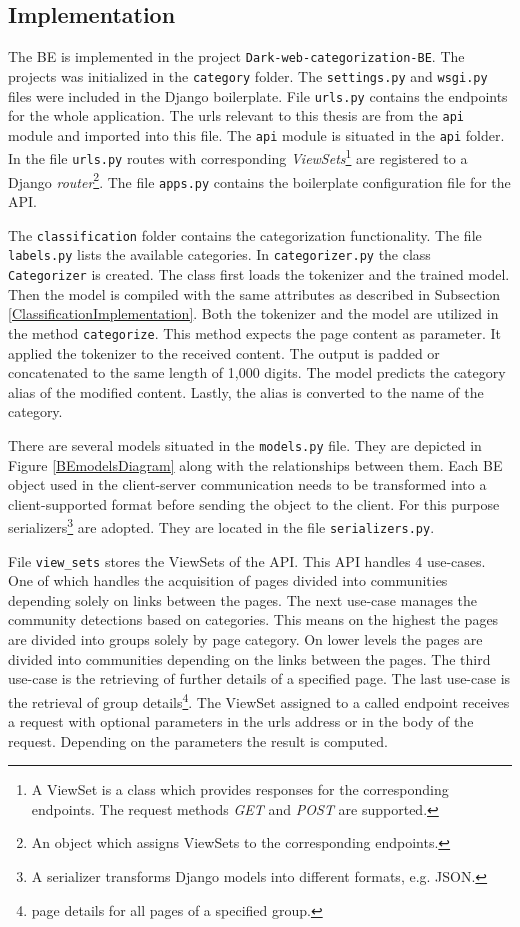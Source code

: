 \subsection{Implementation} \label{APIImplementation}
The BE is implemented in the project \texttt{Dark-web-categorization-BE}. The projects was initialized in the \texttt{category} folder. The \texttt{settings.py} and \texttt{wsgi.py} files were included in the Django boilerplate. File \texttt{urls.py} contains the endpoints for the whole application. The urls relevant to this thesis are from the \texttt{api} module and imported into this file.
The \texttt{api} module is situated in the \texttt{api} folder. In the file \texttt{urls.py} routes with corresponding \textit{ViewSets}\footnote{A ViewSet is a class which provides responses for the corresponding endpoints. The request methods \textit{GET} and \textit{POST} are supported.} are registered to a Django \textit{router}\footnote{An object which assigns ViewSets to the corresponding endpoints.}. The file \texttt{apps.py} contains the boilerplate configuration file for the API. 

The \texttt{classification} folder contains the categorization functionality. The file \texttt{labels.py} lists the available categories. In \texttt{categorizer.py} the class \texttt{Categorizer} is created. The class first loads the tokenizer and the trained model. Then the model is compiled with the same attributes as described in Subsection \ref{ClassificationImplementation}. Both the tokenizer and the model are utilized in the method \texttt{categorize}. This method expects the page content as parameter. It applied the tokenizer to the received content. The output is padded or concatenated to the same length of 1,000 digits. The model predicts the category alias of the modified content. Lastly, the alias is converted to the name of the category.

There are several models situated in the \texttt{models.py} file. They are depicted in Figure \ref{BEmodelsDiagram} along with the relationships between them. Each BE object used in the client-server communication needs to be transformed into a client-supported format before sending the object to the client. For this purpose serializers\footnote{A serializer transforms Django models into different formats, e.g. JSON.} are adopted. They are located in the file \texttt{serializers.py}.

File \texttt{view\_sets} stores the ViewSets of the API. This API handles 4 use-cases. One of which handles the acquisition of pages divided into communities depending solely on links between the pages. The next use-case manages the community detections based on categories. This means on the highest the pages are divided into groups solely by page category. On lower levels the pages are divided into communities depending on the links between the pages. The third use-case is the retrieving of further details of a specified page. The last use-case is the retrieval of group details\footnote{page details for all pages of a specified group.}. The ViewSet assigned to a called endpoint receives a request with optional parameters in the urls address or in the body of the request. Depending on the parameters the result is computed. 

